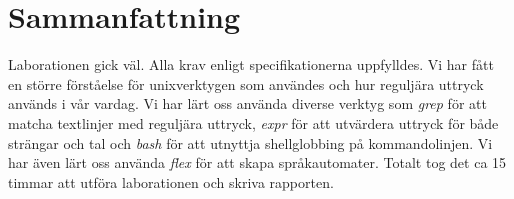 \section{Sammanfattning}
Laborationen gick väl. Alla krav enligt specifikationerna uppfylldes. Vi har fått en större förståelse för unixverktygen som användes och hur reguljära uttryck används i vår vardag. Vi har lärt oss använda diverse verktyg som \emph{grep} för att matcha textlinjer med reguljära uttryck, \emph{expr} för att utvärdera uttryck för både strängar och tal och \emph{bash} för att utnyttja shellglobbing på kommandolinjen. Vi har även lärt oss använda \emph{flex} för att skapa språkautomater. Totalt tog det ca 15 timmar att utföra laborationen och skriva rapporten. 
